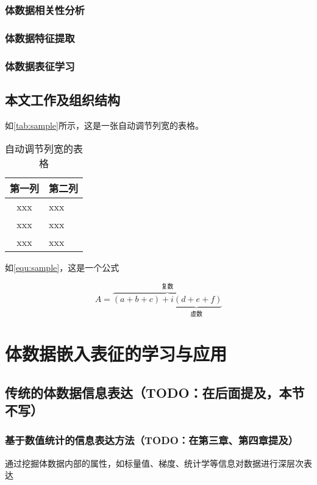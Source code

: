 \subsection{体数据相关性分析}
\subsection{体数据特征提取}
\subsection{体数据表征学习}
\section{本文工作及组织结构}


\par 如\autoref{tab:sample}所示，这是一张自动调节列宽的表格。

\begin{table}[htbp]
    \caption{\label{tab:sample}自动调节列宽的表格}
    \begin{tabularx}{\linewidth}{c|X<{\centering}}
        \hline
        第一列 & 第二列 \\ \hline
        xxx & xxx \\ \hline
        xxx & xxx \\ \hline
        xxx & xxx \\ \hline
    \end{tabularx}
\end{table}


\par 如\autoref{equ:sample}，这是一个公式

\begin{equation}
    \label{equ:sample}
    A=\overbrace{(a+b+c)+\underbrace{i(d+e+f)}_{\text{虚数}}}^{\text{复数}}
\end{equation}

\chapter{体数据嵌入表征的学习与应用}

\section{传统的体数据信息表达（TODO：在后面提及，本节不写）}
\subsection{基于数值统计的信息表达方法（TODO：在第三章、第四章提及）}
通过挖掘体数据内部的属性，如标量值、梯度、统计学等信息对数据进行深层次表达

